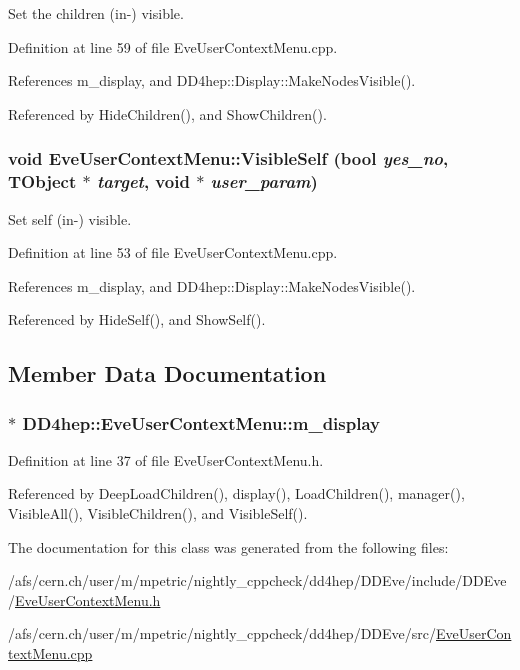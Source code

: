 Set the children (in-\/) visible. 

Definition at line 59 of file EveUserContextMenu.cpp.

References m\_\-display, and DD4hep::Display::MakeNodesVisible().

Referenced by HideChildren(), and ShowChildren().\hypertarget{class_d_d4hep_1_1_eve_user_context_menu_a2c1bc8b4c3aa1fbedb1eed0c26b2fe65}{
\subsubsection[{VisibleSelf}]{\setlength{\rightskip}{0pt plus 5cm}void EveUserContextMenu::VisibleSelf (bool {\em yes\_\-no}, \/  {\bf TObject} $\ast$ {\em target}, \/  void $\ast$ {\em user\_\-param})}}
\label{class_d_d4hep_1_1_eve_user_context_menu_a2c1bc8b4c3aa1fbedb1eed0c26b2fe65}


Set self (in-\/) visible. 

Definition at line 53 of file EveUserContextMenu.cpp.

References m\_\-display, and DD4hep::Display::MakeNodesVisible().

Referenced by HideSelf(), and ShowSelf().

\subsection{Member Data Documentation}
\hypertarget{class_d_d4hep_1_1_eve_user_context_menu_ab3592e822e14b2d25c4f68553df60cd0}{
\subsubsection[{m\_\-display}]{$\ast$ {\bf DD4hep::EveUserContextMenu::m\_\-display}}}
\label{class_d_d4hep_1_1_eve_user_context_menu_ab3592e822e14b2d25c4f68553df60cd0}


Definition at line 37 of file EveUserContextMenu.h.

Referenced by DeepLoadChildren(), display(), LoadChildren(), manager(), VisibleAll(), VisibleChildren(), and VisibleSelf().

The documentation for this class was generated from the following files:\begin{DoxyCompactItemize}
\item 
/afs/cern.ch/user/m/mpetric/nightly\_\-cppcheck/dd4hep/DDEve/include/DDEve/\hyperlink{_eve_user_context_menu_8h}{EveUserContextMenu.h}\item 
/afs/cern.ch/user/m/mpetric/nightly\_\-cppcheck/dd4hep/DDEve/src/\hyperlink{_eve_user_context_menu_8cpp}{EveUserContextMenu.cpp}\end{DoxyCompactItemize}
